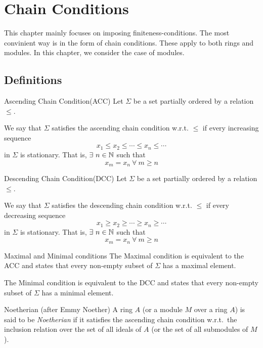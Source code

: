 \chapter{Chain Conditions}  \label{ch:chain_conditions}

This chapter mainly focuses on imposing finiteness-conditions.
The most convinient way is in the form of chain conditions.
These apply to both rings and modules.
In this chapter, we consider the case of modules. \\


\section{Definitions}

\begin{defn}{Ascending Chain Condition(ACC)}{}
	Let \(\Sigma\) be a set partially ordered by a relation \(\leq\).

	We say that \(\Sigma\) satisfies the ascending chain condition w.r.t.
	\(\leq\) if every increasing sequence
	\[
		x_1 \leq x_2 \leq \cdots \leq x_n \leq \cdots
	\]
	in \(\Sigma\) is stationary.
	That is, \(\exists\ n \in \NN\) such that
	\[
		x_m = x_n \ \forall\ m \geq n
	\]
\end{defn}

\begin{defn}{Descending Chain Condition(DCC)}{}
	Let \(\Sigma\) be a set partially ordered by a relation \(\leq\).

	We say that \(\Sigma\) satisfies the descending chain condition w.r.t.
	\(\leq\) if every decreasing sequence
	\[
		x_1 \geq x_2 \geq \cdots \geq x_n \geq \cdots
	\]
	in \(\Sigma\) is stationary.
	That is, \(\exists\ n \in \NN\) such that
	\[
		x_m = x_n \ \forall\ m \geq n
	\]
\end{defn}

\begin{defn}{Maximal and Minimal conditions}{}
	The Maximal condition is equivalent to the ACC and states that
	every non-empty subset of \(\Sigma\) has a maximal element.

	The Minimal condition is equivalent to the DCC and states that
	every non-empty subset of \(\Sigma\) has a minimal element.
\end{defn}

\begin{definition}{Noetherian (after Emmy Noether)}{}{}
	A ring \(A\) (or a module \(M\) over a ring \(A\)) is said to be
	\emph{Noetherian} if it satisfies the ascending chain condition
	w.r.t.\ the inclusion relation over the set of all ideals of \(A\)
	(or the set of all submodules of \(M\)).
\end{definition}

